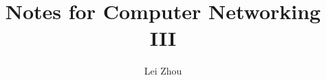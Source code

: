 \documentclass{article}
\begin{document}
\title{Notes for Computer Networking III}
\author{Lei Zhou}
\maketitle

%
%

\end{document}
